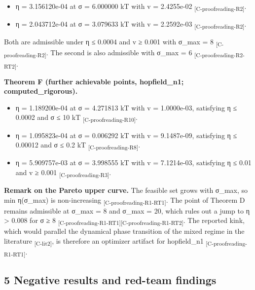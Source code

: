\documentclass[
  english,
  twocolumn,
  10pt]{article}
\providecommand{\tightlist}{%
  \setlength{\itemsep}{0pt}\setlength{\parskip}{0pt}}
\begin{document}
\begin{itemize}
\tightlist
\item
  η = 3.156120e-04 at σ = 6.000000 kT with v = 2.4255e-02
  \textsubscript{[C-proofreading-R2]}.
\item
  η = 2.043712e-04 at σ = 3.079633 kT with v = 2.2592e-03
  \textsubscript{[C-proofreading-R2]}.
\end{itemize}

Both are admissible under η ≤ 0.0004 and v ≥ 0.001 with σ\_max = 8
\textsubscript{[C-proofreading-R2]}. The second is also admissible with
σ\_max = 6 \textsubscript{[C-proofreading-R2-RT2]}.

\textbf{Theorem F (further achievable points, hopfield\_n1;
computed\_rigorous).}

\begin{itemize}
\tightlist
\item
  η = 1.189200e-04 at σ = 4.271813 kT with v = 1.0000e-03, satisfying η
  ≤ 0.0002 and σ ≤ 10 kT \textsubscript{[C-proofreading-R10]}.
\item
  η = 1.095823e-04 at σ = 0.006292 kT with v = 9.1487e-09, satisfying η
  ≤ 0.00012 and σ ≤ 0.2 kT \textsubscript{[C-proofreading-R8]}.
\item
  η = 5.909757e-03 at σ = 3.998555 kT with v = 7.1214e-03, satisfying η
  ≤ 0.01 and v ≥ 0.001 \textsubscript{[C-proofreading-R3]}.
\end{itemize}

\textbf{Remark on the Pareto upper curve.} The feasible set grows with
σ\_max, so min η(σ\_max) is non-increasing
\textsubscript{[C-proofreading-R1-RT1]}. The point of Theorem D remains
admissible at σ\_max = 8 and σ\_max = 20, which rules out a jump to η
\textgreater{} 0.008 for σ ≥ 8
\textsubscript{[C-proofreading-R1-RT1]}\textsubscript{[C-proofreading-R1-RT2]}.
The reported kink, which would parallel the dynamical phase transition
of the mixed regime in the literature \textsubscript{[C-lit2]}, is
therefore an optimizer artifact for hopfield\_n1
\textsubscript{[C-proofreading-R1-RT1]}.

\subsection{5 Negative results and red-team
findings}\label{negative-results-and-red-team-findings}
\end{document}
